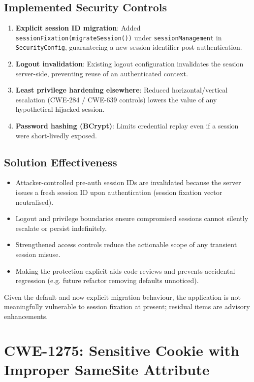 \documentclass[]{UCD_CS_FYP_Report}
\begin{document}
\subsection{Implemented Security Controls}
\begin{enumerate}
	\item \textbf{Explicit session ID migration}: Added \texttt{sessionFixation(migrateSession())} under \texttt{sessionManagement} in \texttt{SecurityConfig}, guaranteeing a new session identifier post-authentication.
	\item \textbf{Logout invalidation}: Existing logout configuration invalidates the session server-side, preventing reuse of an authenticated context.
	\item \textbf{Least privilege hardening elsewhere}: Reduced horizontal/vertical escalation (CWE-284 / CWE-639 controls) lowers the value of any hypothetical hijacked session.
	\item \textbf{Password hashing (BCrypt)}: Limits credential replay even if a session were short-livedly exposed.
\end{enumerate}

\subsection{Solution Effectiveness}
\begin{itemize}
	\item Attacker-controlled pre-auth session IDs are invalidated because the server issues a fresh session ID upon authentication (session fixation vector neutralised).
	\item Logout and privilege boundaries ensure compromised sessions cannot silently escalate or persist indefinitely.
	\item Strengthened access controls reduce the actionable scope of any transient session misuse.
	\item Making the protection explicit aids code reviews and prevents accidental regression (e.g. future refactor removing defaults unnoticed).
\end{itemize}

Given the default and now explicit migration behaviour, the application is not meaningfully vulnerable to session fixation at present; residual items are advisory enhancements.

\section{CWE-1275: Sensitive Cookie with Improper SameSite Attribute}
\end{document}
